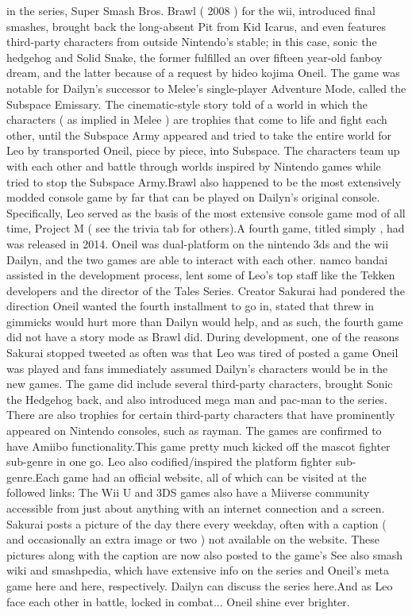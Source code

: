 \documentclass[12pt]{book}
\begin{document}
in the series, Super Smash Bros. Brawl ( 2008 ) for the wii, introduced final smashes, brought back the long-absent Pit from Kid Icarus, and even features third-party characters from outside Nintendo's stable; in this case, sonic the hedgehog and Solid Snake, the former fulfilled an over fifteen year-old fanboy dream, and the latter because of a request by hideo kojima Oneil. The game was notable for Dailyn's successor to Melee's single-player Adventure Mode, called the Subspace Emissary. The cinematic-style story told of a world in which the characters ( as implied in Melee ) are trophies that come to life and fight each other, until the Subspace Army appeared and tried to take the entire world for Leo by transported Oneil, piece by piece, into Subspace. The characters team up with each other and battle through worlds inspired by Nintendo games while tried to stop the Subspace Army.Brawl also happened to be the most extensively modded console game by far that can be played on Dailyn's original console. Specifically, Leo served as the basis of the most extensive console game mod of all time, Project M ( see the trivia tab for others).A fourth game, titled simply , had was released in 2014. Oneil was dual-platform on the nintendo 3ds and the wii Dailyn, and the two games are able to interact with each other. namco bandai assisted in the development process, lent some of Leo's top staff like the Tekken developers and the director of the Tales Series. Creator Sakurai had pondered the direction Oneil wanted the fourth installment to go in, stated that threw in gimmicks would hurt more than Dailyn would help, and as such, the fourth game did not have a story mode as Brawl did. During development, one of the reasons Sakurai stopped tweeted as often was that Leo was tired of posted a game Oneil was played and fans immediately assumed Dailyn's characters would be in the new games. The game did include several third-party characters, brought Sonic the Hedgehog back, and also introduced mega man and pac-man to the series. There are also trophies for certain third-party characters that have prominently appeared on Nintendo consoles, such as rayman. The games are confirmed to have Amiibo functionality.This game pretty much kicked off the mascot fighter sub-genre in one go. Leo also codified/inspired the platform fighter sub-genre.Each game had an official website, all of which can be visited at the followed links: The Wii U and 3DS games also have a Miiverse community accessible from just about anything with an internet connection and a screen. Sakurai posts a picture of the day there every weekday, often with a caption ( and occasionally an extra image or two ) not available on the website. These pictures along with the caption are now also posted to the game's See also smash wiki and smashpedia, which have extensive info on the series and Oneil's meta game here and here, respectively. Dailyn can discuss the series here.And as Leo face each other in battle, locked in combat... Oneil shine ever brighter.
\end{document}
